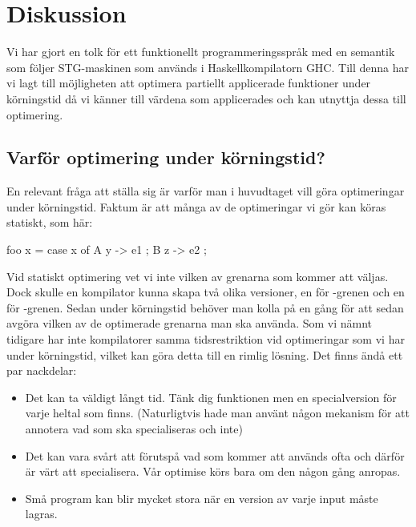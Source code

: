 \documentclass[Rapport]{subfiles}
\begin{document}
\section{Diskussion}
    
Vi har gjort en tolk för ett funktionellt programmeringsspråk
med en semantik som följer STG-maskinen som används i Haskellkompilatorn GHC.
Till denna har vi lagt till möjligheten att optimera partiellt applicerade funktioner under körningstid
då vi känner till värdena som applicerades och kan utnyttja dessa till optimering.

\subsection{Varför optimering under körningstid?}

En relevant fråga att ställa sig är varför man i huvudtaget vill göra optimeringar under körningstid. Faktum är att många av de optimeringar vi gör kan köras statiskt, som här:

\begin{codeEx}

foo x = case x of
        { A y  -> e1
        ; B z  -> e2
        };

\end{codeEx}

Vid statiskt optimering vet vi inte vilken av grenarna som kommer att väljas. Dock skulle en kompilator kunna skapa två olika versioner, en för -grenen och en för 
-grenen. Sedan under körningstid behöver man kolla på  en gång för att sedan avgöra vilken av de optimerade grenarna man ska använda.
Som vi nämnt tidigare har inte kompilatorer samma tidsrestriktion vid optimeringar som vi har under körningstid, vilket kan göra detta till en rimlig lösning. Det finns ändå ett par nackdelar:
\begin{itemize}
    \item Det kan ta väldigt långt tid. Tänk dig  funktionen men en specialversion för varje heltal som finns. (Naturligtvis hade man använt någon mekanism för att annotera vad som ska specialiseras och inte)
    \item Det kan vara svårt att förutspå vad som kommer att används ofta och därför är värt att specialisera. Vår optimise körs bara om den någon gång anropas.
    \item Små program kan blir mycket stora när en version av varje input måste lagras.
\end{itemize}
\end{document}
